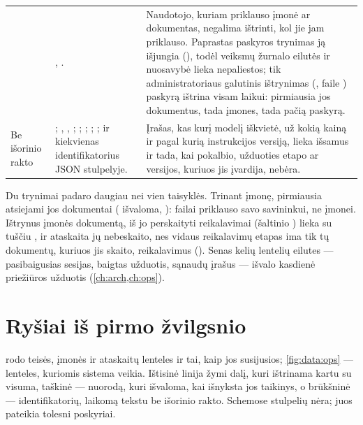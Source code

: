 \begin{xltabular}{\textwidth}{@{}L{22mm}YL{44mm}@{}}
 & , . & Naudotojo, kuriam priklauso įmonė ar dokumentas, negalima ištrinti, kol jie jam priklauso. Paprastas paskyros trynimas ją išjungia (), todėl veiksmų žurnalo eilutės ir nuosavybė lieka nepaliestos; tik administratoriaus galutinis ištrynimas (,  faile ) paskyrą ištrina visam laikui: pirmiausia jos dokumentus, tada įmones, tada pačią paskyrą. \\
Be išorinio rakto & ; , , ; ; ; ; ;  ir kiekvienas identifikatorius JSON stulpelyje. & Įrašas, kas kurį modelį iškvietė, už kokią kainą ir pagal kurią instrukcijos versiją, lieka išsamus ir tada, kai pokalbio, užduoties etapo ar versijos, kuriuos jis įvardija, nebėra. \\
\end{xltabular}

Du trynimai padaro daugiau nei vien taisyklės. Trinant įmonę, pirmiausia atsiejami jos
dokumentai ( išvaloma, ):
failai priklauso savo savininkui, ne įmonei. Ištrynus įmonės dokumentą, iš jo perskaityti
reikalavimai (šaltinio  ) lieka su tuščiu
, ir ataskaita jų nebeskaito, nes vidaus reikalavimų etapas ima tik tų
dokumentų, kuriuos jis skaito, reikalavimus (). Senas kelių lentelių
eilutes --- pasibaigusias sesijas, baigtas užduotis, sąnaudų įrašus --- išvalo kasdienė
priežiūros užduotis (\cref{ch:arch,ch:ops}).

\section{Ryšiai iš pirmo žvilgsnio}\label{sec:data:figures}

 rodo teisės, įmonės ir ataskaitų lenteles ir tai, kaip jos susijusios;
\cref{fig:data:ops} --- lenteles, kuriomis sistema veikia. Ištisinė linija žymi dalį, kuri
ištrinama kartu su visuma, taškinė --- nuorodą, kuri išvaloma, kai išnyksta jos taikinys, o
brūkšninė --- identifikatorių, laikomą tekstu be išorinio rakto. Schemose stulpelių nėra; juos
pateikia tolesni poskyriai.

